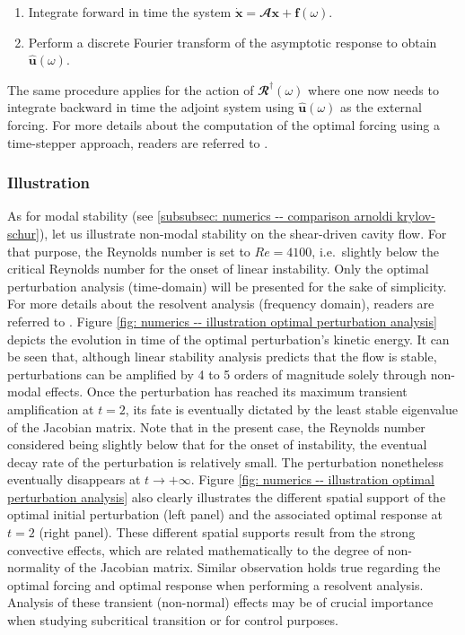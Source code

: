   \begin{enumerate}
    \item Integrate forward in time the system $\dot{\mathbf{x}} = \mathbfcal{A} \mathbf{x} + \mathbf{f}(\omega)$.
    \item Perform a discrete Fourier transform of the asymptotic response to obtain $\hat{\mathbf{u}}(\omega)$.
  \end{enumerate}
  The same procedure applies for the action of $\mathbfcal{R}^{\dagger}(\omega)$ where one now needs to integrate backward in time the adjoint system using $\hat{\mathbf{u}}(\omega)$ as the external forcing. For more details about the computation of the optimal forcing using a time-stepper approach, readers are referred to \cite{jfm:monokrousos:2010}.

  \subsubsection{Illustration}

  As for modal stability (see \textsection \ref{subsubsec: numerics -- comparison arnoldi krylov-schur}), let us illustrate non-modal stability on the shear-driven cavity flow. For that purpose, the Reynolds number is set to $Re=4100$, i.e.\ slightly below the critical Reynolds number for the onset of linear instability. Only the optimal perturbation analysis (time-domain) will be presented for the sake of simplicity. For more details about the resolvent analysis (frequency domain), readers are referred to \cite{jfm:monokrousos:2010, phd:bucci:2017}. Figure \ref{fig: numerics -- illustration optimal perturbation analysis} depicts the evolution in time of the optimal perturbation's kinetic energy. It can be seen that, although linear stability analysis predicts that the flow is stable, perturbations can be amplified by 4 to 5 orders of magnitude solely through non-modal effects. Once the perturbation has reached its maximum transient amplification at $t=2$, its fate is eventually dictated by the least stable eigenvalue of the Jacobian matrix. Note that in the present case, the Reynolds number considered being slightly below that for the onset of instability, the eventual decay rate of the perturbation is relatively small. The perturbation nonetheless eventually disappears at $t \to +\infty$. Figure \ref{fig: numerics -- illustration optimal perturbation analysis} also clearly illustrates the different spatial support of the optimal initial perturbation (left panel) and the associated optimal response at $t=2$ (right panel). These different spatial supports result from the strong convective effects, which are related mathematically to the degree of non-normality of the Jacobian matrix. Similar observation holds true regarding the optimal forcing and optimal response when performing a resolvent analysis. Analysis of these transient (non-normal) effects may be of crucial importance when studying subcritical transition or for control purposes.

